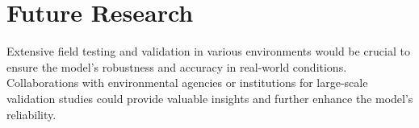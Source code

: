 \chapter{Future Research}
\label{ch:Fr}

Extensive field testing and validation in various environments would be crucial to ensure the model's robustness and accuracy in real-world conditions. Collaborations with environmental agencies or institutions for large-scale validation studies could provide valuable insights and further enhance the model's reliability.


% 				
% 





